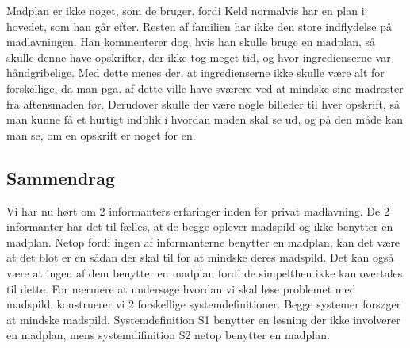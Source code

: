 \begin{description}
Madplan er ikke noget, som de bruger, fordi Keld normalvis har en plan i hovedet, som han går efter. Resten af familien har ikke den store indflydelse på madlavningen. Han kommenterer dog, hvis han skulle bruge en madplan, så skulle denne have opskrifter, der ikke tog meget tid, og hvor ingredienserne var håndgribelige. Med dette menes der, at ingredienserne ikke skulle være alt for forskellige, da man pga. af dette ville have sværere ved at mindske sine madrester fra aftensmaden før. Derudover skulle der være nogle billeder til hver opskrift, så man kunne få et hurtigt indblik i hvordan maden skal se ud, og på den måde kan man se, om en opskrift er noget for en. 

\end{description}

\subsection{Sammendrag}
Vi har nu hørt om 2 informanters erfaringer inden for privat madlavning. De 2 informanter har det til fælles, at de begge oplever madspild og ikke benytter en madplan. Netop fordi ingen af informanterne benytter en madplan, kan det være at det blot er en sådan der skal til for at mindske deres madspild. Det kan også være at ingen af dem benytter en madplan fordi de simpelthen ikke kan overtales til dette. For nærmere at undersøge hvordan vi skal løse problemet med madspild, konstruerer vi 2 forskellige systemdefinitioner. Begge systemer forsøger at mindske madspild. Systemdefinition S1 benytter en løsning der ikke involverer en madplan, mens systemdifinition S2 netop benytter en madplan.